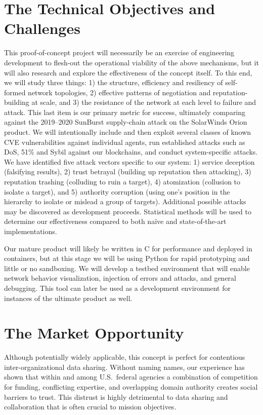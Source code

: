 \documentclass[10pt]{article}
\begin{document}
\section{The Technical Objectives and Challenges}\label{sec:objectives}

This proof-of-concept project will necessarily be an exercise of engineering development to flesh-out the operational viability of the above mechanisms, but it will also research and explore the effectiveness of the concept itself.
To this end, we will study three things: 1) the structure, efficiency and resiliency of self-formed network topologies, 2) effective patterns of negotiation and reputation-building at scale, and 3) the resistance of the network at each level to failure and attack.
This last item is our primary metric for success, ultimately comparing against the 2019--2020 SunBurst supply-chain attack on the SolarWinds Orion product.
We will intentionally include and then exploit several classes of known CVE vulnerabilities against individual agents, run established attacks such as DoS, 51\% and Sybil against our blockchains, and conduct system-specific attacks.
We have identified five attack vectors specific to our system: 1) service deception (falsifying results), 2) trust betrayal (building up reputation then attacking), 3) reputation trashing (colluding to ruin a target), 4) atomization (collusion to isolate a target), and 5) authority corruption (using one's position in the hierarchy to isolate or mislead a group of targets).
Additional possible attacks may be discovered as development proceeds.
Statistical methods will be used to determine our effectiveness compared to both naïve and state-of-the-art implementations.

Our mature product will likely be written in C for performance and deployed in containers, but at this stage we will be using Python for rapid prototyping and little or no sandboxing.
We will develop a testbed environment that will enable network behavior visualization, injection of errors and attacks, and general debugging.
This tool can later be used as a development environment for instances of the ultimate product as well.

\section{The Market Opportunity}\label{sec:opportunity}

Although potentially widely applicable, this concept is perfect for contentious inter-organizational data sharing.
Without naming names, our experience has shown that within and among U.S.\ federal agencies a combination of competition for funding, conflicting expertise, and overlapping domain authority creates social barriers to trust.
This distrust is highly detrimental to data sharing and collaboration that is often crucial to mission objectives.
\end{document}
